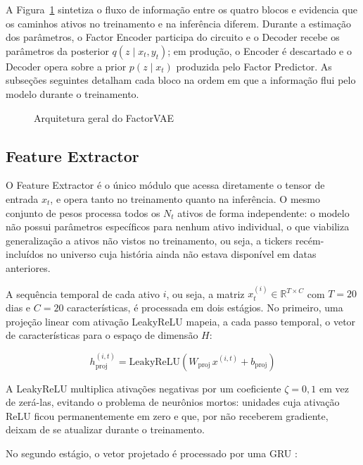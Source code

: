 A Figura~\ref{fig:arquitetura} sintetiza o fluxo de informação entre os quatro blocos
e evidencia que os caminhos ativos no treinamento e na inferência diferem. Durante a
estimação dos parâmetros, o Factor Encoder participa do circuito e o Decoder recebe os
parâmetros da posterior $q(z \mid x_t, y_t)$; em produção, o Encoder é descartado e o
Decoder opera sobre a prior $p(z \mid x_t)$ produzida pelo Factor Predictor. As
subseções seguintes detalham cada bloco na ordem em que a informação flui pelo modelo
durante o treinamento.

\begin{figure}[ht]
    \centering
    
    \caption{Arquitetura geral do FactorVAE}
    \label{fig:arquitetura}
\end{figure}


\subsection{Feature Extractor}
\label{subsec:feature-extractor}

O Feature Extractor é o único módulo que acessa diretamente o tensor de entrada $x_t$,
e opera tanto no treinamento quanto na inferência. O mesmo conjunto de pesos processa
todos os $N_t$ ativos de forma independente: o modelo não possui parâmetros específicos
para nenhum ativo individual, o que viabiliza generalização a ativos não vistos no
treinamento, ou seja, a tickers recém-incluídos no universo cuja história ainda não
estava disponível em datas anteriores.

A sequência temporal de cada ativo $i$, ou seja, a matriz $x_t^{(i)} \in
\mathbb{R}^{T \times C}$ com $T = 20$ dias e $C = 20$ características, é processada
em dois estágios. No primeiro, uma projeção linear com ativação LeakyReLU mapeia, a
cada passo temporal, o vetor de características para o espaço de dimensão $H$:

\begin{equation}
    h_{\text{proj}}^{(i,t)} = \text{LeakyReLU}\!\left(W_{\text{proj}}\, x^{(i,t)} +
    b_{\text{proj}}\right)
    \label{eq:proj-feat}
\end{equation}

A LeakyReLU multiplica ativações negativas por um coeficiente $\zeta = 0{,}1$ em vez
de zerá-las, evitando o problema de neurônios mortos: unidades cuja ativação ReLU
ficou permanentemente em zero e que, por não receberem gradiente, deixam de se
atualizar durante o treinamento.

No segundo estágio, o vetor projetado é processado por uma GRU \parencite{cho2014}:

